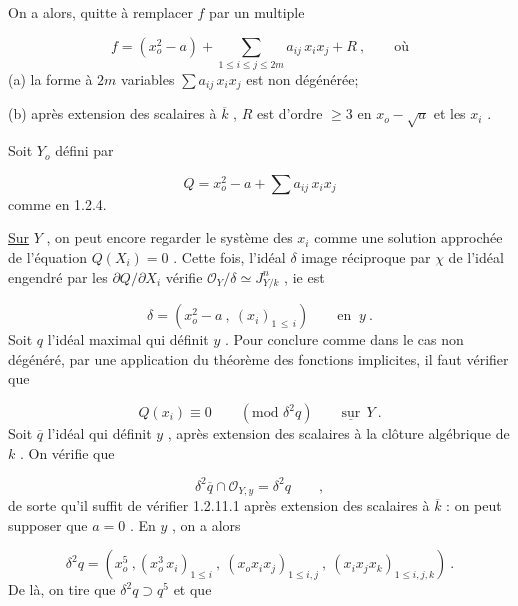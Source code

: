 On a alors, quitte à remplacer $f$ par un multiple

\begin{equation*}
f = (x_o^2 - a) + \sum_{1 \leq i \leq j \leq 2m} a_{ij} \, x_i x_j + R \ , \qquad \mbox{où}
\end{equation*}
(a) la forme à $2m$ variables $\sum a_{ij} \, x_i x_j$ est non dégénérée;

(b) après extension des scalaires à $\overline{k}$ , $R$ est d'ordre $\geq 3$ en $x_o - \sqrt{a}$ et les $x_i$ .



Soit $Y_o$ défini par

\begin{equation*}
Q = x_o^2 - a + \sum a_{ij} \, x_i x_j
\end{equation*}
comme en 1.2.4.

\underline{Sur} $Y$ , on peut encore regarder le système des $x_i$ comme une solution approchée de l'équation $Q(X_i) = 0$ . Cette fois, l'idéal $\delta$ image réciproque par $\chi$ de l'idéal engendré par les $\partial Q/\partial X_i$ vérifie $\mathcal{O}_Y/\delta \simeq J^n_{Y/k}$ , ie est

\begin{equation*}
\delta = (x_o^2 - a \ , \ (x_i)_{1 \, \leq \, i}) \qquad \mbox{en } \ y \ .
\end{equation*}
Soit $q$ l'idéal maximal qui définit $y$ . Pour conclure comme dans le cas non dégénéré, par une application du théorème des fonctions implicites, il faut vérifier que

\begin{equation}\tag{1.2.11.1}
Q(x_i) \equiv 0 \qquad (\mbox{mod } \delta^2 q) \qquad \underline{\mbox{sur}} \ \ Y \ .
\end{equation}
Soit $\overline{q}$ l'idéal qui définit $y$ , après extension des scalaires à la clôture algébrique de $k$ . On vérifie que

\begin{equation*}
\delta^2 \overline{q} \cap \mathcal{O}_{Y,y} = \delta^2 q \qquad ,
\end{equation*}
de sorte qu'il suffit de vérifier 1.2.11.1 après extension des scalaires à $\overline{k}$ : on peut supposer que $a = 0$ . En $y$ , on a alors

\begin{equation*}
\delta^2 q = (x_o^5 \ , (x_o^3 \, x_i)_{1 \leq i} \ , \ (x_o x_i x_j)_{1 \leq i,j} \ , \ (x_i x_j x_k)_{1 \leq i,j,k}) \ .
\end{equation*}
De là, on tire que $\delta^2 q \supset q^5$ et que

